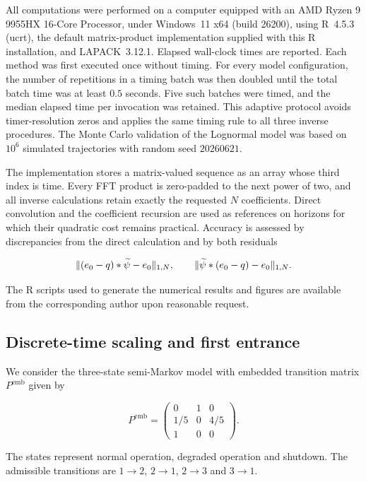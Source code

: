 \documentclass[3p,12pt,authoryear]{elsarticle}
\theoremstyle{definition}
\theoremstyle{remark}
\newcommand{\ez}{e_{\mathstrut 0}}
\begin{document}
All computations were performed on a computer equipped with an AMD Ryzen 9 9955HX 16-Core Processor, under Windows~11 x64 (build 26200), using R~4.5.3 (ucrt), the default matrix-product implementation supplied with this R installation, and LAPACK~3.12.1. Elapsed wall-clock times are reported. Each method was first executed once without timing. For every model configuration, the number of repetitions in a timing batch was then doubled until the total batch time was at least $0.5$ seconds. Five such batches were timed, and the median elapsed time per invocation was retained. This adaptive protocol avoids timer-resolution zeros and applies the same timing rule to all three inverse procedures. The Monte Carlo validation of the Lognormal model was based on $10^6$ simulated trajectories with random seed $20260621$.

The implementation stores a matrix-valued sequence as an array whose third index is time. Every FFT product is zero-padded to the next power of two, and all inverse calculations retain exactly the requested $N$ coefficients. Direct convolution and the coefficient recursion are used as references on horizons for which their quadratic cost remains practical. Accuracy is assessed by discrepancies from the direct calculation and by both residuals

\begin{equation*}
\|(\ez-q)*\widetilde\psi-\ez\|_{1,N},
\qquad
\|\widetilde\psi*(\ez-q)-\ez\|_{1,N}.
\end{equation*}

The R scripts used to generate the numerical results and figures are available from the corresponding author upon reasonable request.

\subsection{Discrete-time scaling and first entrance}

We consider the three-state semi-Markov model with embedded transition matrix $P^{\mathrm{emb}}$ given by

\begin{equation*}
P^{\mathrm{emb}}
=
\begin{pmatrix}
0&1&0\\
1/5&0&4/5\\
1&0&0
\end{pmatrix}.
\end{equation*}

The states represent normal operation, degraded operation and shutdown. The admissible transitions are $1\to2$, $2\to1$, $2\to3$ and $3\to1$.
\end{document}
